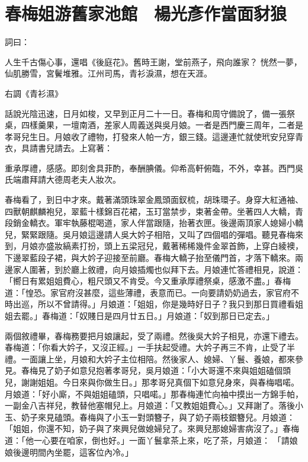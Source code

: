 %

\chapter{春梅姐游舊家池館　楊光彥作當面豺狼}

\begin{showcontents}{}


詞曰：

人生千古傷心事，還唱《後庭花》。舊時王謝，堂前燕子，飛向誰家？
恍然一夢，仙肌勝雪，宮鬢堆雅。江州司馬，青衫淚濕，想在天涯。

右調《青衫濕》

話說光陰迅速，日月如梭，又早到正月二十一日。春梅和周守備說了，備一張祭桌，四樣羹果，一壇南酒，差家人周義送與吳月娘。一者是西門慶三周年，二者是孝哥兒生日。月娘收了禮物，打發來人帕一方，銀三錢。這邊連忙就使玳安兒穿青衣，具請書兒請去。上寫著：

重承厚禮，感感。即刻舍具菲酌，奉酬腆儀。仰希高軒俯臨，不外，幸甚。西門吳氏端肅拜請大德周老夫人妝次。

春梅看了，到日中才來。戴著滿頭珠翠金鳳頭面釵梳，胡珠環子。身穿大紅通袖、四獸朝麒麟袍兒，翠藍十樣錦百花裙，玉玎當禁步，束著金帶。坐著四人大轎，青段銷金轎衣。軍牢執藤棍喝道，家人伴當跟隨，抬著衣匣。後邊兩頂家人媳婦小轎兒，緊緊跟隨。吳月娘這邊請人吳大妗子相陪，又叫了四個唱的彈唱。聽見春梅來到，月娘亦盛妝縞素打扮，頭上五梁冠兒，戴著稀稀幾件金翠首飾，上穿白綾襖，下邊翠藍段子裙，與大妗子迎接至前廳。春梅大轎子抬至儀門首，才落下轎來。兩邊家人圍著，到於廳上敘禮，向月娘插燭也似拜下去。月娘連忙答禮相見，說道：「嚮日有累姐姐費心，粗尺頭又不肯受。今又重承厚禮祭桌，感激不盡。」春梅道：「惶恐。家官府沒甚麼，這些薄禮，表意而已。一向要請奶奶過去，家官府不時出巡，所以不曾請得。」月娘道：「姐姐，你是幾時好日子？我只到那日買禮看姐姐去罷。」春梅道：「奴賤日是四月廿五日。」月娘道：「奴到那日已定去。」

兩個敘禮畢，春梅務要把月娘讓起，受了兩禮。然後吳大妗子相見，亦還下禮去。春梅道：「你看大妗子，又沒正經。」一手扶起受禮。大妗子再三不肯，止受了半禮。一面讓上坐，月娘和大妗子主位相陪。然後家人、媳婦、丫鬟、養娘，都來參見。春梅見了奶子如意兒抱著孝哥兒，吳月娘道：「小大哥還不來與姐姐磕個頭兒，謝謝姐姐。今日來與你做生日。」那孝哥兒真個下如意兒身來，與春梅唱喏。月娘道：「好小廝，不與姐姐磕頭，只唱喏。」那春梅連忙向袖中摸出一方錦手帕，一副金八吉祥兒，教替他塞帽兒上。月娘道：「又教姐姐費心。」又拜謝了。落後小玉、奶子來見磕頭。春梅與了小玉一對頭簪子，與了奶子兩枝銀簪兒。月娘道：「姐姐，你還不知，奶子與了來興兒做媳婦兒了。來興兒那媳婦害病沒了。」春梅道：「他一心要在咱家，倒也好。」一面丫鬟拿茶上來，吃了茶，月娘道： 「請娘娘後邊明間內坐罷，這客位內冷。」


\end{showcontents}
